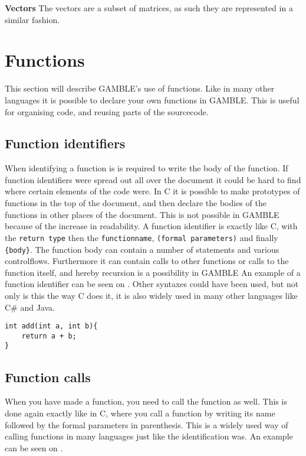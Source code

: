 \textbf{Vectors}
The vectors are a subset of matrices, as such they are represented in a similar fashion.

\section{Functions}
This section will describe GAMBLE's use of functions. 
Like in many other languages it is possible to declare your own functions in GAMBLE.
This is useful for organising code, and reusing parts of the sourcecode.

\subsection{Function identifiers}
When identifying a function is is required to write the body of the function.
If function identifiers were spread out all over the document it could be hard to find where certain elements of the code were.
In C it is possible to make prototypes of functions in the top of the document, and then declare the bodies of the functions in other places of the document. 
This is not possible in GAMBLE because of the increase in readability.
A function identifier is exactly like C, with the \texttt{return type} then the \texttt{functionname}, \texttt{(formal parameters)} and finally \texttt{\{body\}}.
The function body can contain a number of statements and various controlflows.
Furthermore it can contain calls to other functions or calls to the function itself, and hereby recursion is a possibility in GAMBLE
An example of a function identifier can be seen on .
Other syntaxes could have been used, but not only is this the way C does it, it is also widely used in many other languages like C\# and Java.


\begin{lstlisting}[caption={Function Idemtifier},label={lst:functionID}]                                                        
int add(int a, int b){
	return a + b;
}
\end{lstlisting}

\subsection{Function calls}
When you have made a function, you need to call the function as well.
This is done again exactly like in C, where you call a function by writing its name followed by the formal parameters in parenthesis.
This is a widely used way of calling functions in many languages just like the identification was.
An example can be seen on .

